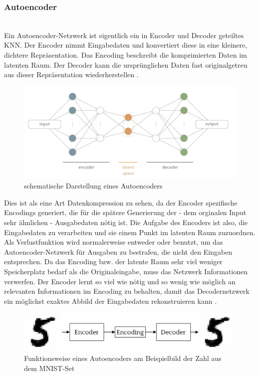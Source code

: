 \subsubsection{Autoencoder}~\\
Ein Autoencoder-Netzwerk ist eigentlich ein in Encoder und Decoder geteiltes KNN. Der Encoder nimmt Eingabedaten und konvertiert diese in eine kleinere, dichtere Repräsentation. Das Encoding beschreibt die komprimierten Daten im latenten Raum. Der Decoder kann die ursprünglichen Daten fast originalgetreu aus dieser Repräsentation wiederherstellen \cite[S.499ff]{goodl16}.
\begin{figure}[H]
    \centering
    \includegraphics[width=1.0\textwidth,angle=0]{abb/ae_spinner}
    \caption[schematische Darstellung eines Autoencoders]{schematische Darstellung eines Autoencoders \cite{Spi2018}}
\end{figure}
Dies ist als eine Art Datenkompression zu sehen, da der Encoder spezifische Encodings generiert, die für die spätere Generierung der - dem orginalen Input sehr ähnlichen - Ausgabedaten nötig ist. Die Aufgabe des Encoders ist also, die Eingabedaten zu verarbeiten und sie einem Punkt im latenten Raum zuzuordnen. Als Verlustfunktion wird normalerweise entweder  oder  benutzt, um das Autoencoder-Netzwerk für Ausgaben zu bestrafen, die nicht den Eingaben entsprechen.
Da das Encoding bzw. der latente Raum sehr viel weniger Speicherplatz bedarf als die Originaleingabe, muss das Netzwerk Informationen verwerfen. Der Encoder lernt so viel wie nötig und so wenig wie möglich an relevanten Informationen im Encoding zu behalten, damit das Decodernetzwerk ein möglichst exaktes Abbild der Eingabedaten rekonstruieren kann \cite[S.64]{fos19}.
\begin{figure}[H]
    \centering
    \includegraphics[width=1.0\textwidth,angle=0]{abb/autoencoder_standard}
    \caption[Autoencoder]{Funktionsweise eines Autoencoders am Beispielbild der Zahl \frqq{5\flqq} aus dem MNIST-Set}
\end{figure}
